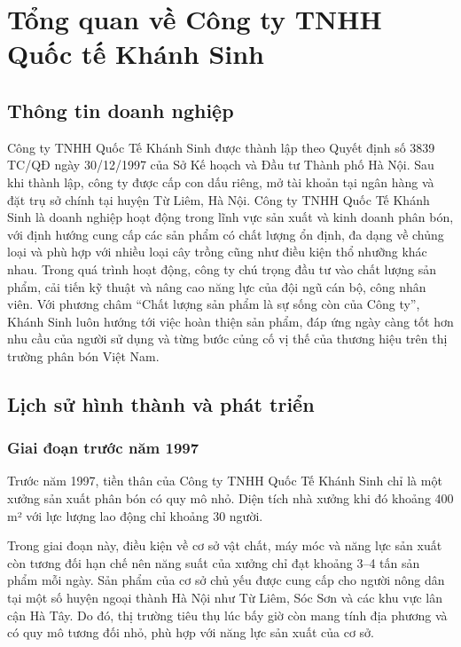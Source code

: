 \chapter{Tổng quan về Công ty TNHH Quốc tế Khánh Sinh}

\section{Thông tin doanh nghiệp}
Công ty TNHH Quốc Tế Khánh Sinh được thành lập theo Quyết định số 3839 TC/QĐ ngày 30/12/1997 của Sở Kế hoạch và Đầu tư Thành phố Hà Nội. 
Sau khi thành lập, công ty được cấp con dấu riêng, mở tài khoản tại ngân hàng và đặt trụ sở chính tại huyện Từ Liêm, Hà Nội.\cite{company-internal-documents}
Công ty TNHH Quốc Tế Khánh Sinh là doanh nghiệp hoạt động trong lĩnh vực sản xuất và kinh doanh phân bón, với định hướng cung cấp các sản phẩm có chất lượng ổn định, đa dạng về chủng loại và phù hợp với nhiều loại cây trồng cũng như điều kiện thổ nhưỡng khác nhau.\cite{company-internal-documents} 
Trong quá trình hoạt động, công ty chú trọng đầu tư vào chất lượng sản phẩm, cải tiến kỹ thuật và nâng cao năng lực của đội ngũ cán bộ, công nhân viên. \cite{company-internal-documents}
Với phương châm “Chất lượng sản phẩm là sự sống còn của Công ty”, Khánh Sinh luôn hướng tới việc hoàn thiện sản phẩm, đáp ứng ngày càng tốt hơn nhu cầu của người sử dụng và từng bước củng cố vị thế của thương hiệu trên thị trường phân bón Việt Nam.\cite{company-internal-documents}



\section{Lịch sử hình thành và phát triển}
\subsection{Giai đoạn trước năm 1997}
Trước năm 1997, tiền thân của Công ty TNHH Quốc Tế Khánh Sinh chỉ là một xưởng sản xuất phân bón có quy mô nhỏ. 
Diện tích nhà xưởng khi đó khoảng 400 m² với lực lượng lao động chỉ khoảng 30 người.\cite{company-internal-documents} 

Trong giai đoạn này, điều kiện về cơ sở vật chất, máy móc và năng lực sản xuất còn tương đối hạn chế nên năng suất của xưởng chỉ đạt khoảng 3–4 tấn sản phẩm mỗi ngày.\cite{company-internal-documents} 
Sản phẩm của cơ sở chủ yếu được cung cấp cho người nông dân tại một số huyện ngoại thành Hà Nội như Từ Liêm, Sóc Sơn và các khu vực lân cận Hà Tây. \cite{company-internal-documents}
Do đó, thị trường tiêu thụ lúc bấy giờ còn mang tính địa phương và có quy mô tương đối nhỏ, phù hợp với năng lực sản xuất của cơ sở.

